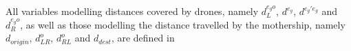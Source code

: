 \noindent
All variables modelling  distances covered by drones, namely $d_L^{e_go}$, $d^{e_g}$, $d^{e_g'e_g}$ and $d_R^{e_go}$,  as well as those modelling the distance travelled by the mothership, namely $d_{origin}$, $d_{LR}^o$, $d_{RL}^o$ and $d_{dest}$, are defined in  
 
 
 

